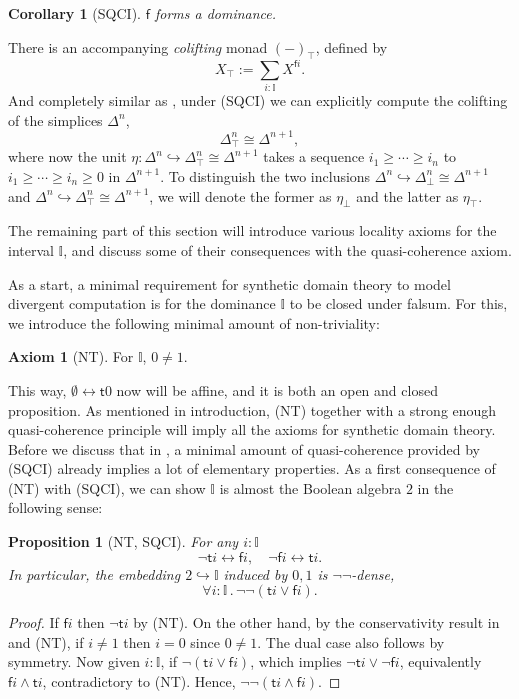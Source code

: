 \documentclass[12pt]{amsart}
\newtheorem{corollary}[theorem]{Corollary}
\newtheorem{proposition}[theorem]{Proposition}
\theoremstyle{definition}
\newtheorem*{axiom}{Axiom}
\newcommand{\mbb}[1]{\mathbb{#1}}
\newcommand{\I}{\mbb I}
\newcommand{\ms}[1]{\mathsf{#1}}
\newcommand{\hook}{\hookrightarrow}
\newcommand{\dneg}{\neg\neg}
\newcommand{\prt}{_{\bot}}
\newcommand{\cprt}{_{\top}}
\newcommand{\fa}[2]{\forall #1\!\colon\!\!#2\mathpunct{.}}
\newcommand{\emp}{\emptyset}
\newcommand{\eq}{\leftrightarrow}
\begin{document}
\begin{corollary}[SQCI]
  $\ms f$ forms a dominance.
\end{corollary}

There is an accompanying \emph{colifting} monad $(-)\cprt$, defined by
\[ X\cprt := \sum_{i:\I} X^{\ms fi}. \]
And completely similar as , under (SQCI) we can explicitly compute the colifting of the simplices $\Delta^n$,
\[ \Delta^n\cprt \cong \Delta^{n+1}, \]
where now the unit $\eta : \Delta^n \hook \Delta^n\cprt \cong \Delta^{n+1}$ takes a sequence $i_1 \ge \cdots \ge i_n$ to $i_1 \ge \cdots \ge i_n \ge 0$ in $\Delta^{n+1}$. To distinguish the two inclusions $\Delta^n \hook \Delta^n\prt \cong \Delta^{n+1}$ and $\Delta^n \hook \Delta^{n}\cprt \cong \Delta^{n+1}$, we will denote the former as $\eta\prt$ and the latter as $\eta\cprt$.

The remaining part of this section will introduce various locality axioms for the interval $\I$, and discuss some of their consequences with the quasi-coherence axiom.

As a start, a minimal requirement for synthetic domain theory to model divergent computation is for the dominance $\I$ to be closed under falsum. For this, we introduce the following minimal amount of non-triviality:

\begin{axiom}[NT]\label{ax:nt}
  For $\I$, $0 \neq 1$.
\end{axiom}


This way, $\emp \eq \ms t0$ now will be affine, and it is both an open and closed proposition. As mentioned in introduction, (NT) together with a strong enough quasi-coherence principle will imply all the axioms for synthetic domain theory. Before we discuss that in , a minimal amount of quasi-coherence provided by (SQCI) already implies a lot of elementary properties. As a first consequence of (NT) with (SQCI), we can show $\I$ is almost the Boolean algebra $2$ in the following sense:

\begin{proposition}[NT, SQCI]\label{prop:filed}
  For any $i : \I$ 
  \[ \neg \ms ti \eq \ms fi, \quad \neg\ms fi \eq \ms ti. \]
  In particular, the embedding $2 \hook \I$ induced by $0,1$ is $\neg\neg$-dense,
  \[ \fa i\I \dneg(\ms ti \vee \ms fi). \]
\end{proposition}
\begin{proof}
  If $\ms fi$ then $\neg\ms ti$ by (NT). On the other hand, by the conservativity result in  and (NT), if $i \neq 1$ then $i = 0$ since $0 \neq 1$. The dual case also follows by symmetry. Now given $i :\I$, if $\neg(\ms ti \vee \ms fi)$, which implies $\neg\ms ti \vee \neg\ms fi$, equivalently $\ms fi \wedge \ms ti$, contradictory to (NT). Hence, $\neg\neg(\ms ti \wedge \ms fi)$.
\end{proof}
\end{document}
